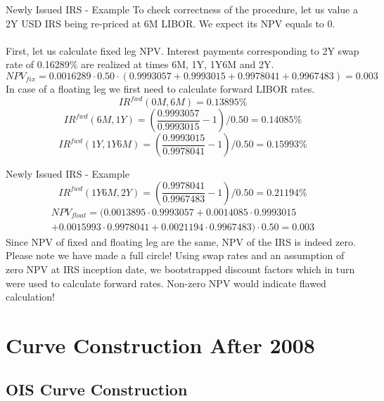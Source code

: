 \documentclass{beamer}
\begin{document}
\begin{frame}{Newly Issued IRS - Example}
To check correctness of the procedure, let us value a 2Y USD IRS being re-priced at 6M LIBOR. We expect its NPV equals to 0.
\\~\\
First, let us calculate fixed leg NPV. Interest payments corresponding to 2Y swap rate of 0.16289\% are realized at times 6M, 1Y, 1Y6M and 2Y.
\begin{equation*}
NPV_{fix} = 0.0016289 \cdot 0.50 \cdot (0.9993057 + 0.9993015 + 0.9978041 + 0.9967483) = 0.003
\end{equation*}
In case of a floating leg we first need to calculate forward LIBOR rates.
\begin{equation*}
IR^{fwd}(0M, 6M) = 0.13895\%
\end{equation*}
\begin{equation*}
IR^{fwd}(6M, 1Y) = \left(\frac{0.9993057}{0.9993015} - 1 \right)/0.50 = 0.14085\%
\end{equation*}
\begin{equation*}
IR^{fwd}(1Y, 1Y6M) = \left(\frac{0.9993015}{0.9978041} - 1 \right)/0.50 = 0.15993\%
\end{equation*}
\end{frame}

\begin{frame}{Newly Issued IRS - Example}
\begin{equation*}
IR^{fwd}(1Y6M, 2Y) = \left(\frac{0.9978041}{0.9967483} - 1 \right)/0.50 = 0.21194\%
\end{equation*}
\begin{multline*}
NPV_{float} = (0.0013895 \cdot 0.9993057 + 0.0014085 \cdot 0.9993015\\
+ 0.0015993 \cdot 0.9978041 + 0.0021194 \cdot 0.9967483) \cdot 0.50 = 0.003
\end{multline*}
Since NPV of fixed and floating leg are the same, NPV of the IRS is indeed zero. Please note we have made a full circle! Using swap rates and an assumption of zero NPV at IRS inception date, we bootstrapped discount factors which in turn were used to calculate forward rates. Non-zero NPV would indicate flawed calculation!
\end{frame}

\section{Curve Construction After 2008}

\subsection{OIS Curve Construction}
\end{document}
